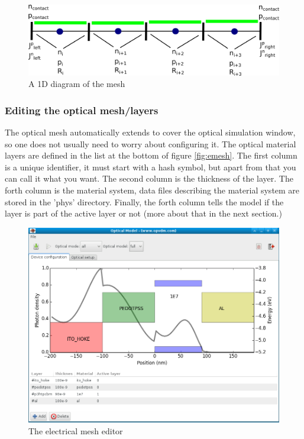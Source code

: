 \documentclass[11pt]{article}
\begin{document}
\begin{figure}[ht!]
\centering
\includegraphics[width=140mm]{./images/mesh.png}
\caption{A 1D diagram of the mesh}
\label{fig:emeshdiagram}
\end{figure}


\subsubsection{Editing the optical mesh/layers}
The optical mesh automatically extends to cover the optical simulation window, so one does not usually need to worry about configuring it.  The optical material layers are defined in the list at the bottom of figure \ref{fig:emesh}.  The first column is a unique identifier, it must start with a hash symbol, but apart from that you can call it what you want.  The second column is the thickness of the layer.  The forth column is the material system, data files describing the material system are stored in the 'phys' directory.  Finally, the forth column tells the model if the layer is part of the active layer or not (more about that in the next section.)

\begin{figure}[ht!]
\centering
\includegraphics[width=140mm]{./images/opticalsimulation.png}
\caption{The electrical mesh editor}
\label{fig:opticalsimulation}
\end{figure}
\end{document}
